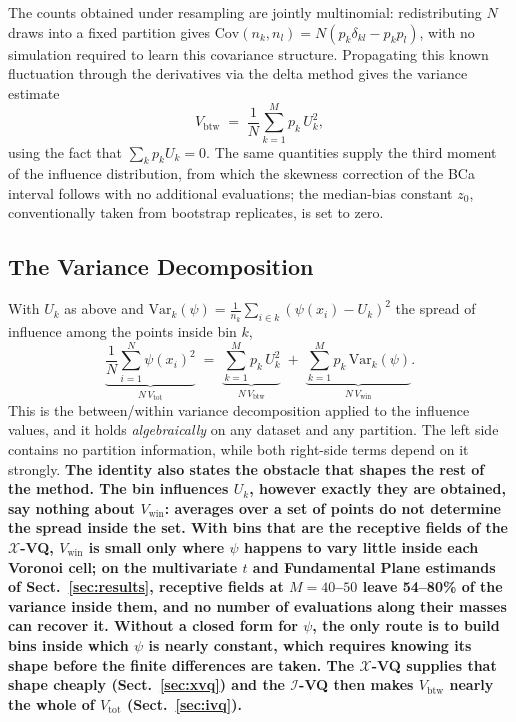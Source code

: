 \documentclass[runningheads]{llncs}
\newif\ifrev \revtrue
\newcommand{\rev}[1]{\ifrev{\color{blue}\bfseries #1}\else#1\fi}
\newcommand{\ifl}{\psi}
\newcommand{\Vcell}{V_{\mathrm{btw}}}
\newcommand{\Vwithin}{V_{\mathrm{win}}}
\newcommand{\Vtotal}{V_{\mathrm{tot}}}
\newcommand{\XVQ}{\ensuremath{\mathcal{X}}-VQ}
\newcommand{\IVQ}{\ensuremath{\mathcal{I}}-VQ}
\begin{document}
The counts obtained under resampling are jointly multinomial: redistributing $N$ draws into a fixed partition gives $\mathrm{Cov}(n_k, n_l) = N(p_k \delta_{kl} - p_k p_l)$, with no simulation required to learn this covariance structure. Propagating this known fluctuation through the derivatives via the delta method gives the variance estimate
\begin{equation}\label{eq:Vcell}
\Vcell \;=\; \frac1N \sum_{k=1}^{M} p_k\, U_k^{2},
\end{equation}
using the fact that $\sum_k p_k U_k = 0$. The same quantities supply the third moment of the influence distribution, from which the skewness correction of the BCa interval \cite{efron1987} follows with no additional evaluations; the median-bias constant $z_0$, conventionally taken from bootstrap replicates, is set to zero.

\subsection{The Variance Decomposition}\label{sec:identity}

With $U_k$ as above and $\mathrm{Var}_k(\ifl) = \tfrac{1}{n_k}\sum_{i \in k}(\ifl(x_i) - U_k)^2$ the spread of influence among the points inside bin $k$,
\begin{equation}\label{eq:identity}
\underbrace{\frac1N\sum_{i=1}^{N} \ifl(x_i)^{2}}_{N\,\Vtotal}
\;=\;
\underbrace{\sum_{k=1}^{M} p_k\, U_k^{2}}_{N\,\Vcell}
\;+\;
\underbrace{\sum_{k=1}^{M} p_k\, \mathrm{Var}_k(\ifl)}_{N\,\Vwithin}.
\end{equation}
This is the between/within variance decomposition applied to the influence values, and it holds \emph{algebraically} on any dataset and any partition. The left side contains no partition information, while both right-side terms depend on it strongly. \rev{The identity also states the obstacle that shapes the rest of the method. The bin influences $U_k$, however exactly they are obtained, say nothing about $\Vwithin$: averages over a set of points do not determine the spread inside the set. With bins that are the receptive fields of the \XVQ, $\Vwithin$ is small only where $\psi$ happens to vary little inside each Voronoi cell; on the multivariate $t$ and Fundamental Plane estimands of Sect.~\ref{sec:results}, receptive fields at $M = 40$--$50$ leave 54--80\% of the variance inside them, and no number of evaluations along their masses can recover it. Without a closed form for $\psi$, the only route is to build bins inside which $\psi$ is nearly constant, which requires knowing its shape before the finite differences are taken. The \XVQ{} supplies that shape cheaply (Sect.~\ref{sec:xvq}) and the \IVQ{} then makes $\Vcell$ nearly the whole of $\Vtotal$ (Sect.~\ref{sec:ivq}).}
\end{document}
